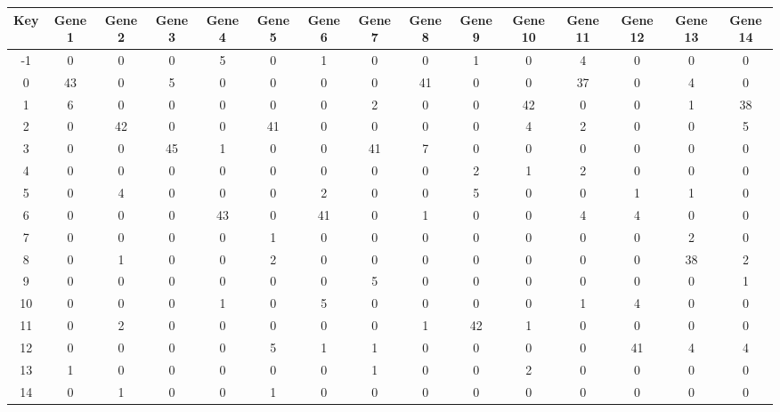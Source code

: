 \begin{tabular}{|c|c|c|c|c|c|c|c|c|c|c|c|c|c|c|}
\hline
Key & Gene 1 & Gene 2 & Gene 3 & Gene 4 & Gene 5 & Gene 6 & Gene 7 & Gene 8 & Gene 9 & Gene 10 & Gene 11 & Gene 12 & Gene 13 & Gene 14 \\
\hline
-1 & 0 & 0 & 0 & 5 & 0 & 1 & 0 & 0 & 1 & 0 & 4 & 0 & 0 & 0 \\
0 & 43 & 0 & 5 & 0 & 0 & 0 & 0 & 41 & 0 & 0 & 37 & 0 & 4 & 0 \\
1 & 6 & 0 & 0 & 0 & 0 & 0 & 2 & 0 & 0 & 42 & 0 & 0 & 1 & 38 \\
2 & 0 & 42 & 0 & 0 & 41 & 0 & 0 & 0 & 0 & 4 & 2 & 0 & 0 & 5 \\
3 & 0 & 0 & 45 & 1 & 0 & 0 & 41 & 7 & 0 & 0 & 0 & 0 & 0 & 0 \\
4 & 0 & 0 & 0 & 0 & 0 & 0 & 0 & 0 & 2 & 1 & 2 & 0 & 0 & 0 \\
5 & 0 & 4 & 0 & 0 & 0 & 2 & 0 & 0 & 5 & 0 & 0 & 1 & 1 & 0 \\
6 & 0 & 0 & 0 & 43 & 0 & 41 & 0 & 1 & 0 & 0 & 4 & 4 & 0 & 0 \\
7 & 0 & 0 & 0 & 0 & 1 & 0 & 0 & 0 & 0 & 0 & 0 & 0 & 2 & 0 \\
8 & 0 & 1 & 0 & 0 & 2 & 0 & 0 & 0 & 0 & 0 & 0 & 0 & 38 & 2 \\
9 & 0 & 0 & 0 & 0 & 0 & 0 & 5 & 0 & 0 & 0 & 0 & 0 & 0 & 1 \\
10 & 0 & 0 & 0 & 1 & 0 & 5 & 0 & 0 & 0 & 0 & 1 & 4 & 0 & 0 \\
11 & 0 & 2 & 0 & 0 & 0 & 0 & 0 & 1 & 42 & 1 & 0 & 0 & 0 & 0 \\
12 & 0 & 0 & 0 & 0 & 5 & 1 & 1 & 0 & 0 & 0 & 0 & 41 & 4 & 4 \\
13 & 1 & 0 & 0 & 0 & 0 & 0 & 1 & 0 & 0 & 2 & 0 & 0 & 0 & 0 \\
14 & 0 & 1 & 0 & 0 & 1 & 0 & 0 & 0 & 0 & 0 & 0 & 0 & 0 & 0 \\
\hline
\end{tabular}